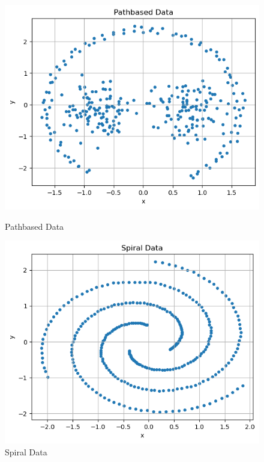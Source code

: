 \documentclass{article}
\begin{document}
\begin{figure}[H]
    \centering
    \begin{minipage}[b]{0.49\textwidth}
        \centering
        \includegraphics[width=\textwidth]{ec.png}
        \caption{Pathbased Data}
    \end{minipage}
    \hfill
    \begin{minipage}[b]{0.49\textwidth}
        \centering
        \includegraphics[width=\textwidth]{ed.png}
        \caption{Spiral Data}
    \end{minipage}
\end{figure}
\end{document}
